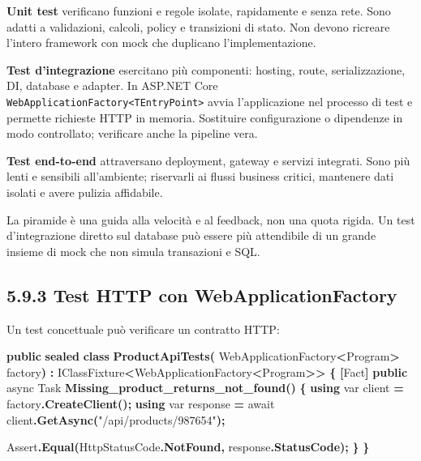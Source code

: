 \documentclass[
  italian,
  10pt,
]{book}
\newenvironment{Shaded}{\begin{snugshade}}{\end{snugshade}}
\newcommand{\DataTypeTok}[1]{\textcolor[rgb]{0.13,0.29,0.53}{#1}}
\newcommand{\FunctionTok}[1]{\textcolor[rgb]{0.13,0.29,0.53}{\textbf{#1}}}
\newcommand{\KeywordTok}[1]{\textcolor[rgb]{0.13,0.29,0.53}{\textbf{#1}}}
\newcommand{\NormalTok}[1]{#1}
\newcommand{\OperatorTok}[1]{\textcolor[rgb]{0.81,0.36,0.00}{\textbf{#1}}}
\newcommand{\StringTok}[1]{\textcolor[rgb]{0.31,0.60,0.02}{#1}}
\begin{document}
\textbf{Unit test} verificano funzioni e regole isolate, rapidamente e
senza rete. Sono adatti a validazioni, calcoli, policy e transizioni di
stato. Non devono ricreare l'intero framework con mock che duplicano
l'implementazione.

\textbf{Test d'integrazione} esercitano più componenti: hosting, route,
serializzazione, DI, database e adapter. In ASP.NET Core
\texttt{WebApplicationFactory\textless{}TEntryPoint\textgreater{}} avvia
l'applicazione nel processo di test e permette richieste HTTP in
memoria. Sostituire configurazione o dipendenze in modo controllato;
verificare anche la pipeline vera.

\textbf{Test end-to-end} attraversano deployment, gateway e servizi
integrati. Sono più lenti e sensibili all'ambiente; riservarli ai flussi
business critici, mantenere dati isolati e avere pulizia affidabile.

La piramide è una guida alla velocità e al feedback, non una quota
rigida. Un test d'integrazione diretto sul database può essere più
attendibile di un grande insieme di mock che non simula transazioni e
SQL.

\subsection{5.9.3 Test HTTP con
WebApplicationFactory}\label{test-http-con-webapplicationfactory}

Un test concettuale può verificare un contratto HTTP:

\begin{Shaded}
\begin{Highlighting}[]
\KeywordTok{public} \KeywordTok{sealed} \KeywordTok{class} \FunctionTok{ProductApiTests}\OperatorTok{(}
\NormalTok{    WebApplicationFactory}\OperatorTok{\textless{}}\NormalTok{Program}\OperatorTok{\textgreater{}}\NormalTok{ factory}\OperatorTok{)}
    \OperatorTok{:}\NormalTok{ IClassFixture}\OperatorTok{\textless{}}\NormalTok{WebApplicationFactory}\OperatorTok{\textless{}}\NormalTok{Program}\OperatorTok{\textgreater{}\textgreater{}}
\OperatorTok{\{}
    \OperatorTok{[}\NormalTok{Fact}\OperatorTok{]}
    \KeywordTok{public}\NormalTok{ async Task }\FunctionTok{Missing\_product\_returns\_not\_found}\OperatorTok{()}
    \OperatorTok{\{}
        \KeywordTok{using} \DataTypeTok{var}\NormalTok{ client }\OperatorTok{=}\NormalTok{ factory}\OperatorTok{.}\FunctionTok{CreateClient}\OperatorTok{();}
        \KeywordTok{using} \DataTypeTok{var}\NormalTok{ response }\OperatorTok{=}
\NormalTok{            await client}\OperatorTok{.}\FunctionTok{GetAsync}\OperatorTok{(}\StringTok{"/api/products/987654"}\OperatorTok{);}

\NormalTok{        Assert}\OperatorTok{.}\FunctionTok{Equal}\OperatorTok{(}\NormalTok{HttpStatusCode}\OperatorTok{.}\FunctionTok{NotFound}\OperatorTok{,}\NormalTok{ response}\OperatorTok{.}\FunctionTok{StatusCode}\OperatorTok{);}
    \OperatorTok{\}}
\OperatorTok{\}}
\end{Highlighting}
\end{Shaded}
\end{document}
